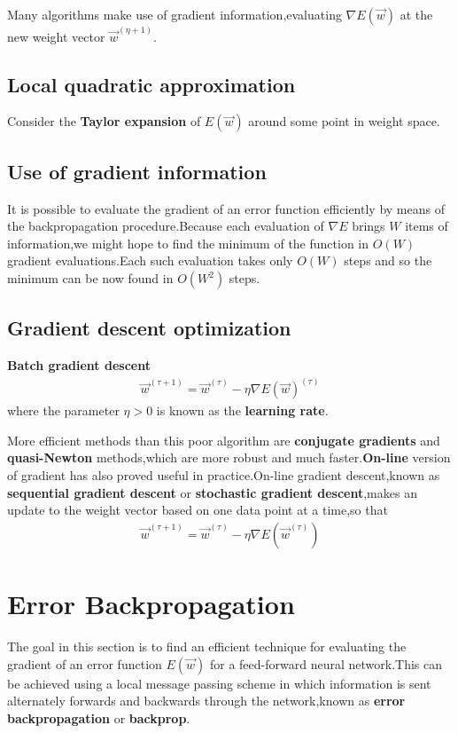 Many algorithms make use of gradient information,evaluating $\nabla E(\vec{w})$  at the new weight vector $\vec{w}^{(\eta+1)}$.

\subsection{Local quadratic approximation}
Consider the \textbf{Taylor expansion} of $E(\vec{w})$ around some point in weight space.

\subsection{Use of gradient information}
It is possible to evaluate the gradient of an error function efficiently by means of the backpropagation procedure.Because each evaluation of $\nabla E$ brings $W$ items of information,we might hope to find the minimum of the function in $O(W)$ gradient evaluations.Each such evaluation takes only $O(W)$ steps and so the minimum can be now found in $O(W^2)$ steps.
\subsection{Gradient descent optimization}
\textbf{Batch gradient descent}
\begin{align}
    \vec{w}^{(\tau+1)}=\vec{w}^{(\tau)}-\eta\nabla E(\vec{w})^{(\tau)}
\end{align}
where the parameter $\eta>0$ is known as the \textbf{learning rate}.

More efficient methods than this poor algorithm are \textbf{conjugate gradients} and \textbf{quasi-Newton} methods,which are more robust and much faster.\textbf{On-line} version of gradient has also proved useful in practice.On-line gradient descent,known as \textbf{sequential gradient descent } or \textbf{stochastic gradient descent},makes an update to the weight vector based on one data point at a time,so that
\begin{align}
    \vec{w}^{(\tau+1)}=\vec{w}^{(\tau)}-\eta \nabla E(\vec{w}^{(\tau)})
\end{align}


\section{Error Backpropagation}
The goal in this section is to find an efficient technique for evaluating the gradient of an error function $E(\vec{w})$ for a feed-forward neural network.This can be achieved using a local message passing scheme in which information is sent alternately forwards and backwards through the network,known as \textbf{error backpropagation} or \textbf{backprop}.

